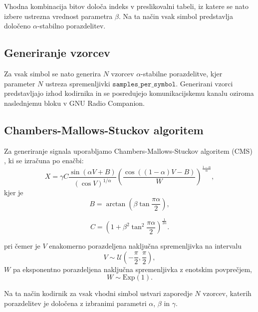 \documentclass[a4paper, 12pt, openany]{book}
\begin{document}
Vhodna kombinacija bitov določa indeks v preslikovalni tabeli, iz katere se nato izbere ustrezna vrednost parametra $\beta$. Na ta način vsak simbol predstavlja določeno $\alpha$-stabilno porazdelitev.

\subsection{Generiranje vzorcev}
Za vsak simbol se nato generira $N$ vzorcev $\alpha$-stabilne porazdelitve, kjer parameter $N$ ustreza spremenljivki $\texttt{samples\_per\_symbol}$. Generirani vzorci predstavljajo izhod kodirnika in se posredujejo komunikacijskemu kanalu oziroma naslednjemu bloku v GNU Radio Companion.

\subsection{Chambers-Mallows-Stuckov algoritem}
\begin{tcolorbox}[breakable,colback=blue!5!white,colframe=blue!50!black,
title=Postopek 1: Generiranje vzorcev z algoritmom CMS]
\label{met:cms_generator}
Za generiranje signala uporabljamo Chambers-Mallows-Stuckov algoritem (CMS) \cite{ahmed2017random}\cite{weron1996chambers}, ki se izračuna po enačbi:
\begin{equation}
X=\gamma C
\frac{\sin\left(\alpha V+B\right)}
{\left(\cos V\right)^{1/\alpha}}
\left(
\frac{\cos\left((1-\alpha)V-B\right)}
{W}
\right)^{\frac{1-\alpha}{\alpha}},
\end{equation}
kjer je
\begin{equation}
B=\arctan\left(\beta\tan\frac{\pi\alpha}{2}\right),
\end{equation}

\begin{equation}
C=\left(1+\beta^2\tan^2\frac{\pi\alpha}{2}\right)^{\frac{1}{2\alpha}}.
\end{equation}

pri čemer je $V$ enakomerno porazdeljena naključna spremenljivka na intervalu \begin{equation} V\sim\mathcal{U}\left(-\frac{\pi}{2},\frac{\pi}{2}\right), \end{equation} $W$ pa eksponentno porazdeljena naključna spremenljivka z enotskim povprečjem, \begin{equation} W\sim\mathrm{Exp}(1). \end{equation}

Na ta način kodirnik za vsak vhodni simbol ustvari zaporedje $N$ vzorcev, katerih porazdelitev je določena z izbranimi parametri $\alpha$, $\beta$ in $\gamma$.
\end{tcolorbox}
\end{document}

